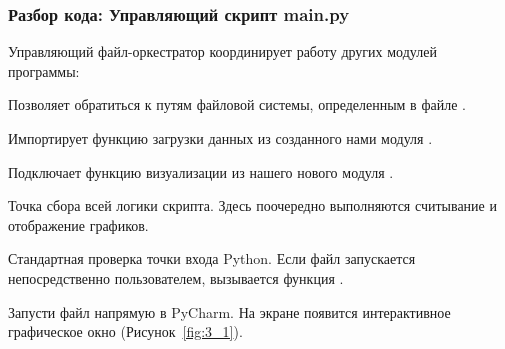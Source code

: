 \subsubsection{Разбор кода: Управляющий скрипт main.py}

Управляющий файл-оркестратор координирует работу других модулей программы:

\begin{syntaxdesc}
    \item[Импорт конфигурации \mycode{import config} (строка 1)] Позволяет обратиться к путям файловой системы, определенным в файле .
    \item[Импорт функций \mycode{from data_loader import load_tds_data} (строка 2)] Импортирует функцию загрузки данных из созданного нами модуля .
    \item[Импорт графиков \mycode{from plots import plot_time_signals} (строка 3)] Подключает функцию визуализации из нашего нового модуля .
    \item[Главная функция \mycode{def main():} (строка 5)] Точка сбора всей логики скрипта. Здесь поочередно выполняются считывание и отображение графиков.
    \item[Запуск скрипта \mycode{if __name__ == "__main__":} (строка 13)] Стандартная проверка точки входа Python. Если файл запускается непосредственно пользователем, вызывается функция .
\end{syntaxdesc}


Запусти файл  напрямую в PyCharm. На экране появится интерактивное графическое окно (Рисунок~\ref{fig:3_1}).


